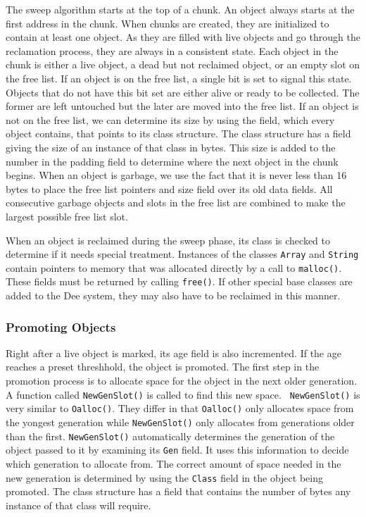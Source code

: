 The sweep algorithm starts at the top of a chunk.  An object always
starts at the first address in the chunk.  When chunks are created,
they are initialized to contain at least one object.  As they are
filled with live objects and go through the reclamation process, they
are always in a consistent state.  Each object in the chunk is either
a live object, a dead but not reclaimed object, or an empty slot on
the free list.  If an object is on the free list, a single bit is set
to signal this state.  Objects that do not have this bit set are
either alive or ready to be collected.  The former are left untouched
but the later are moved into the free list.  If an object is not on
the free list, we can determine its size by using the field, which
every object contains, that points to its class structure.  The class
structure has a field giving the size of an instance of that class in
bytes.  This size is added to the number in the padding field to
determine where the next object in the chunk begins.  When an object
is garbage, we use the fact that it is never less than 16 bytes to place
the free list pointers and size field over its old data fields.  All
consecutive garbage objects and slots in the free list are combined to
make the largest possible free list slot.

When an object is reclaimed during the sweep phase, its class is checked
to determine if it needs special treatment.  Instances of the classes
{\tt Array} and {\tt String} contain pointers to memory that was
allocated directly by a call to {\tt malloc()}.  These fields must be
returned by calling {\tt free()}.  If other special base classes are
added to the Dee system, they may also have to be reclaimed in this
manner.

\subsubsection{Promoting Objects}

Right after a live object is marked, its age field is also
incremented.  If the age reaches a preset threshhold, the object is
promoted.  The first step in the promotion process is to allocate
space for the object in the next older generation.  A function called
{\tt NewGenSlot()} is called to find this new space.  {\tt
NewGenSlot()} is very similar to {\tt Oalloc()}.  They differ in that
{\tt Oalloc()} only allocates space from the yongest generation while
{\tt NewGenSlot()} only allocates from generations older than the
first.  {\tt NewGenSlot()} automatically determines the generation of
the object passed to it by examining its {\tt Gen} field.  It uses
this information to decide which generation to allocate from.  The
correct amount of space needed in the new generation is determined by
using the {\tt Class} field in the object being promoted.  The class
structure has a field that contains the number of bytes any instance
of that class will require.

